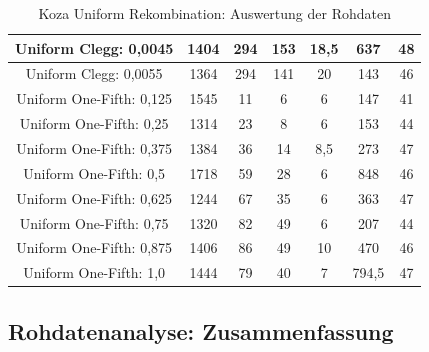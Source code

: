 \begin{table}[H]
\begin{tabular}{c | c | c | c | c | c | c}
		\hline
		Uniform Clegg: 0,0045 & 1404 & 294 & 153 & 18,5 & 637 & 48\\
		\hline
		Uniform Clegg: 0,0055 & 1364 & 294 & 141 & 20 & 143 & 46\\
		\hline
		Uniform One-Fifth: 0,125 & 1545 & 11 & 6 & 6 & 147 & 41\\
		\hline
		Uniform One-Fifth: 0,25 & 1314 & 23 & 8 & 6 & 153 & 44\\
		\hline
		Uniform One-Fifth: 0,375 & 1384 & 36 & 14 & 8,5 & 273 & 47\\
		\hline
		Uniform One-Fifth: 0,5 & 1718 & 59 & 28 & 6 & 848 & 46\\
		\hline
		Uniform One-Fifth: 0,625 & 1244 & 67 & 35 & 6 & 363 & 47\\
		\hline
		Uniform One-Fifth: 0,75 & 1320 & 82 & 49 & 6 & 207 & 44\\
		\hline
		Uniform One-Fifth: 0,875 & 1406 & 86 & 49 & 10 & 470 & 46\\
		\hline
		Uniform One-Fifth: 1,0 & 1444 & 79 & 40 & 7 & 794,5 & 47\\
	\end{tabular}
	\caption{Koza Uniform Rekombination: Auswertung der Rohdaten}
	\label{table:kozaUniformRohdaten}
\end{table}


\subsection{Rohdatenanalyse: Zusammenfassung}
\label{subsec:rohdatenZusammenfassung}

